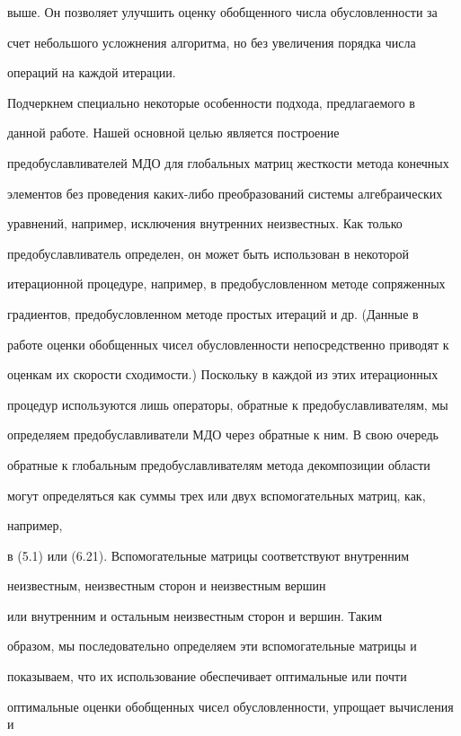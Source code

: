 выше. Он позволяет улучшить оценку обобщенного числа обусловленности за


счет небольшого усложнения алгоритма, но без увеличения порядка числа


операций на каждой итерации.





Подчеркнем специально некоторые особенности подхода, предлагаемого в


данной работе. Нашей основной целью является построение


предобуславливателей МДО для глобальных матриц жесткости метода конечных


элементов без проведения каких-либо преобразований системы алгебраических


уравнений, например, исключения внутренних неизвестных. Как только


предобуславливатель определен, он может быть использован в некоторой


итерационной процедуре, например, в предобусловленном методе сопряженных


градиентов, предобусловленном методе простых итераций и др. (Данные в


работе оценки обобщенных чисел обусловленности непосредственно приводят к


оценкам их скорости сходимости.) Поскольку в каждой из этих итерационных


процедур используются лишь операторы, обратные к предобуславливателям, мы


определяем предобуславливатели МДО через обратные к ним. В свою очередь


обратные к глобальным предобуславливателям метода декомпозиции области


могут определяться как суммы трех или двух вспомогательных матриц, как,


например,


в (5.1) или (6.21). Вспомогательные матрицы соответствуют внутренним


неизвестным, неизвестным сторон и неизвестным вершин


или внутренним и остальным неизвестным сторон и вершин. Таким


образом, мы последовательно определяем эти вспомогательные матрицы и


показываем, что их использование обеспечивает оптимальные или почти


оптимальные оценки обобщенных чисел обусловленности, упрощает вычисления и


